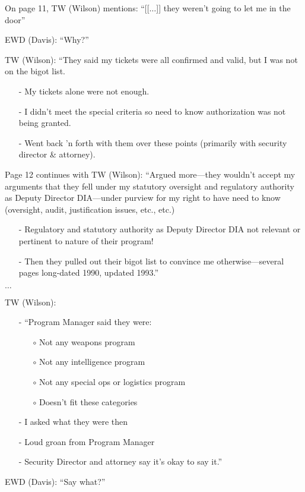 \begin{svgraybox}
On page 11, TW (Wilson) mentions: ``[[$\ldots$]] they weren't going to let me in the door''

\noindent EWD (Davis): ``Why?''

\noindent TW (Wilson): ``They said my tickets were all confirmed and valid, but I was not on the bigot list.
\begin{enumerate}
\item[-]
My tickets alone were not enough.
\item[-]
I didn't meet the special criteria so need to know authorization was not being granted.
\item[-] Went back 'n forth with them over these points (primarily with security director {\&} attorney).
\end{enumerate}

Page 12 continues with TW (Wilson): ``Argued more---they wouldn't accept my arguments that they fell under my statutory
oversight and regulatory authority as Deputy Director DIA---under purview for my right
to have need to know (oversight, audit, justification issues, etc., etc.)
\begin{enumerate}
\item[-]
Regulatory and statutory authority as Deputy Director DIA not relevant or pertinent to nature of their program!
\item[-]
Then they pulled out their bigot list to convince me otherwise---several pages long-dated 1990, updated 1993.''
\end{enumerate}
$\ldots$


\noindent TW (Wilson):
\begin{enumerate}
\item[-]
``Program Manager said they were:
\begin{enumerate}
\item[$\circ$]  Not any weapons program
\item[$\circ$] Not any intelligence program
\item[$\circ$] Not any special ops or logistics program
\item[$\circ$] Doesn't fit these categories
\end{enumerate}
\item[-] I asked what they were then
\item[-] Loud groan from Program Manager
\item[-] Security Director and attorney say it's okay to say it.''
\end{enumerate}

\noindent EWD (Davis): ``Say what?''


\end{svgraybox}
